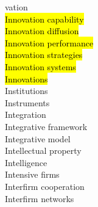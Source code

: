 \documentclass[a4paper]{article}
\begin{document}
\begin{multicols*}{2}
\begin{footnotesize}
vation \\ \hl{Innovation capability} \\ \hl{Innovation diffusion} \\ \hl{Innovation performance} \\ \hl{Innovation strategies} \\ \hl{Innovation systems} \\ \hl{Innovations} \\ Institutions \\ Instruments \\ Integration \\ Integrative framework \\ Integrative model \\ Intellectual property \\ Intelligence \\ Intensive firms \\ Interfirm cooperation \\ Interfirm networks 
\end{footnotesize}
\end{multicols*}
\end{document}
